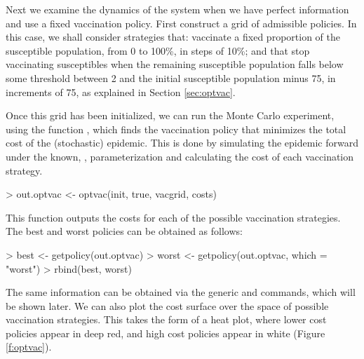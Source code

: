 \documentclass[shortnames,nojss]{jss}
\begin{document}
Next we examine the dynamics of the system when we have perfect
information and use a fixed vaccination policy. First construct a grid
of admissible policies. In this case, we shall consider strategies
that: vaccinate a fixed proportion of the susceptible population, from
0 to 100\%, in steps of 10\%; and that stop vaccinating susceptibles
when the remaining susceptible population falls below some threshold
between 2 and the initial susceptible population minus 75, in
increments of 75, as explained in Section \ref{sec:optvac}.
\begin{Schunk}
\end{Schunk}
Once this grid has been initialized, we
can run the Monte Carlo experiment, using the function ,
which finds the vaccination policy that minimizes the total cost of
the (stochastic) epidemic.  This is done by simulating the epidemic
forward under the known, , parameterization and calculating
the cost of each vaccination strategy.  
\begin{Schunk}
\begin{Sinput}
> out.optvac <- optvac(init, true, vacgrid, costs)
\end{Sinput}
\end{Schunk}
This function outputs the costs
for each of the possible vaccination strategies. The best and worst
policies can be obtained as follows: 
\begin{Schunk}
\begin{Sinput}
> best <- getpolicy(out.optvac)
> worst <- getpolicy(out.optvac, which = "worst")
> rbind(best, worst)
\end{Sinput}
\end{Schunk}
The same information can be obtained via the generic 
and  commands, which will be shown later.  We can also
plot the cost surface over the space of possible vaccination
strategies. This takes the form of a heat plot, where lower cost
policies appear in deep red, and high cost policies appear in white
(Figure \ref{f:optvac}).
\end{document}

